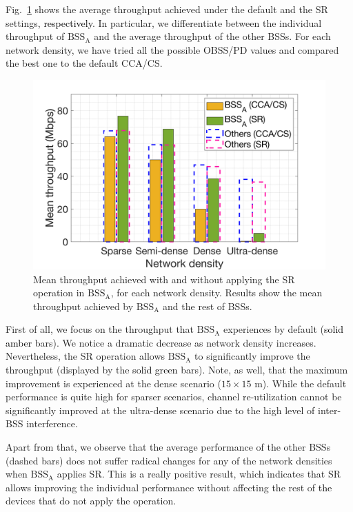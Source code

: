 \documentclass{ieeeaccess}
\begin{document}
Fig.~\ref{fig:SIM_2_1} shows the average throughput achieved under the default and the SR settings\textcolor{black}{, respectively}. In particular, we differentiate between the individual throughput of $\text{BSS}_\text{A}$ and the average throughput of the other BSSs. For each network density, we have tried all the possible OBSS/PD values and compared the best one to the default CCA/CS.

\begin{figure}[ht!]
	\centering		
	\includegraphics[width=.9\columnwidth]{SIM_2_1}
	\caption{Mean throughput achieved with and without applying the SR operation in $\text{BSS}_\text{A}$, for each network density. Results show the mean throughput achieved by $\text{BSS}_\text{A}$ and the rest of BSSs.}
	\label{fig:SIM_2_1}
\end{figure}

First of all, we focus on the throughput that $\text{BSS}_\text{A}$ experiences by default (\textcolor{black}{solid amber} bars). We notice a dramatic decrease as network density increases. Nevertheless, the SR operation allows $\text{BSS}_\text{A}$ to significantly improve the throughput (displayed by the \textcolor{black}{solid green} bars). Note, as well, that the maximum improvement is experienced at the dense scenario ($15\times15$ m). While the default performance is quite high for sparser scenarios, channel re-utilization cannot be significantly improved at the ultra-dense scenario due to the high level of inter-BSS interference.

Apart from that, we observe that the average performance of the other BSSs (dashed bars) does not suffer radical changes for any of the network densities when $\text{BSS}_\text{A}$ applies SR. This is a really positive result, which indicates that SR allows improving the individual performance without affecting the rest of \textcolor{black}{the} devices that do not apply the operation.
\end{document}
